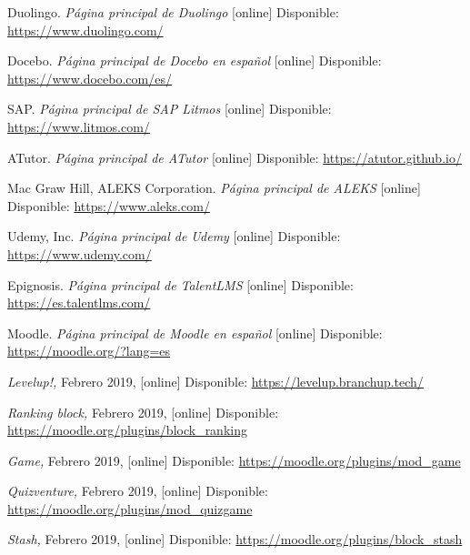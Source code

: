 \begin{thebibliography}{9}
    Duolingo. \textit{Página principal de Duolingo} [online] Disponible: \url{https://www.duolingo.com/}

    Docebo. \textit{Página principal de Docebo en español} [online] Disponible:
    \url{https://www.docebo.com/es/}

    SAP. \textit{Página principal de SAP Litmos} [online] Disponible:
    \url{https://www.litmos.com/}

    ATutor. \textit{Página principal de ATutor} [online] Disponible:
    \url{https://atutor.github.io/}

    Mac Graw Hill, ALEKS Corporation. \textit{Página principal de ALEKS} [online] Disponible:
    \url{https://www.aleks.com/}

    Udemy, Inc. \textit{Página principal de Udemy} [online]  Disponible:
    \url{https://www.udemy.com/}

    Epignosis. \textit{Página principal de TalentLMS} [online]  Disponible:
    \url{https://es.talentlms.com/}

    Moodle. \textit{Página principal de Moodle en español} [online] Disponible:
    \url{https://moodle.org/?lang=es}



        \textit{Levelup!,}
        Febrero 2019, [online] Disponible:
        \url{https://levelup.branchup.tech/}

        \textit{Ranking block,}
        Febrero 2019, [online] Disponible:
        \url{https://moodle.org/plugins/block_ranking}

        \textit{Game,}
        Febrero 2019, [online] Disponible:
        \url{https://moodle.org/plugins/mod_game}

        \textit{Quizventure,}
        Febrero 2019, [online] Disponible:
        \url{https://moodle.org/plugins/mod_quizgame}

        \textit{Stash,}
        Febrero 2019, [online] Disponible:
        \url{https://moodle.org/plugins/block_stash}


\end{thebibliography}
